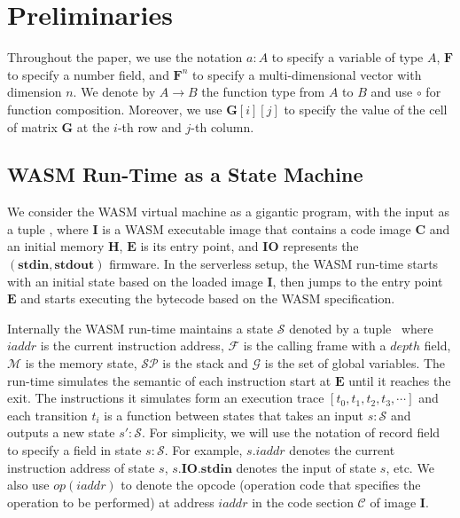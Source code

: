 \section{Preliminaries}
\label{chp:preliminary}

Throughout the paper, we use the notation $a:A$ to specify a variable of type $A$,  $\mathbf{F}$ to specify a number field, and $\mathbf{F}^{n}$ to specify a multi-dimensional vector with dimension $n$. We denote  by $A \rightarrow B$ the function type from $A$ to $B$ and use $\circ$ for function composition. Moreover, we use $\mathbf{G}[i][j]$ to specify the value of the cell of matrix $\mathbf{G}$ at the $i$-th row and $j$-th column.

\subsection{WASM Run-Time as a State Machine}
\label{chp:exec-trace}
We consider the WASM virtual machine as a gigantic program, with the input as a tuple \initstate, where $\mathbf{I}$ is a WASM executable image that contains a code image $\mathbf{C}$ and an initial memory $\mathbf{H}$, $\mathbf{E}$ is its entry point, and $\mathbf{IO}$ represents the $(\mathbf{stdin}, \mathbf{stdout})$ firmware. In the serverless setup, the WASM run-time starts with an initial state based on the loaded image $\mathbf{I}$, then jumps to the entry point $\mathbf{E}$ and starts executing the bytecode based on the WASM specification. 

Internally the WASM run-time maintains a state $\mathcal{S}$ denoted by a tuple \fullstate \, where $iaddr$ is the current instruction address, $\mathcal{F}$ is the calling frame with a $depth$ field, $\mathcal{M}$ is the memory state, $\mathcal{SP}$ is the stack and $\mathcal{G}$ is the set of global variables. The run-time simulates the semantic of each instruction start at $\mathbf{E}$ until it reaches the exit. The instructions it simulates form an execution trace $\left[t_0, t_1, t_2, t_3, \cdots \right]$ and each transition $t_i$ is a function between states that takes an input $s:\mathcal{S}$ and outputs a new state $s':\mathcal{S}$. For simplicity, we will use the notation of record field to specify a field in state $s:\mathcal{S}$. For example, $s.iaddr$ denotes the current instruction address of state $s$, $s.\mathbf{IO}.\mathbf{stdin}$ denotes the input of state $s$, etc. We also use $op(iaddr)$ to denote the opcode (operation code that specifies the operation to be performed) at address $iaddr$ in the code section $\mathcal{C}$ of image $\mathbf{I}$.

